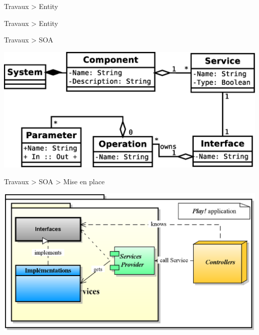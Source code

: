 \documentclass[HeilHazel,pdf,final,colorBG,slideColor]{prosper}
\begin{document}

\begin{slide}{Travaux > Entity}


\end{slide}


\begin{slide}{Travaux > Entity}

\end{slide}


\begin{slide}{Travaux > SOA}

  \bc{} 
    \includegraphics[scale=.45]{img/SOA_simple.eps}
  \ec{}

\end{slide}

\begin{slide}{Travaux > SOA > Mise en place}

  \bc{} 
    \includegraphics[scale=.3]{img/SOA_impl.eps} 
  \ec{}

\end{slide}
\end{document}
